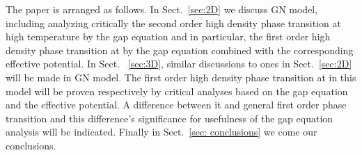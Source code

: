 \documentclass[a4paper,eqsecnum]{revtex4}
\begin{document}
\indent The paper is arranged as follows. In Sect.~\ref{sec:2D} we discuss \coordHE{} GN 
model, including analyzing critically the second order high density phase transition 
at high temperature \coordHE{} by the gap equation and in particular, the first order high density phase transition at \coordHE{} by the gap equation combined with the corresponding 
effective potential.  In Sect. ~\ref{sec:3D}, similar discussions to ones 
in Sect.~\ref{sec:2D} will be made in \coordHE{} GN model. The first order high density 
phase transition at \coordHE{} in this model will be proven respectively by critical 
analyses based on the gap equation and the effective potential. A difference between 
it and general first order phase transition and this difference's significance for 
usefulness of the gap equation analysis will be indicated. Finally in 
Sect.~\ref{sec: conclusions} we come our conclusions. 
\end{document}
